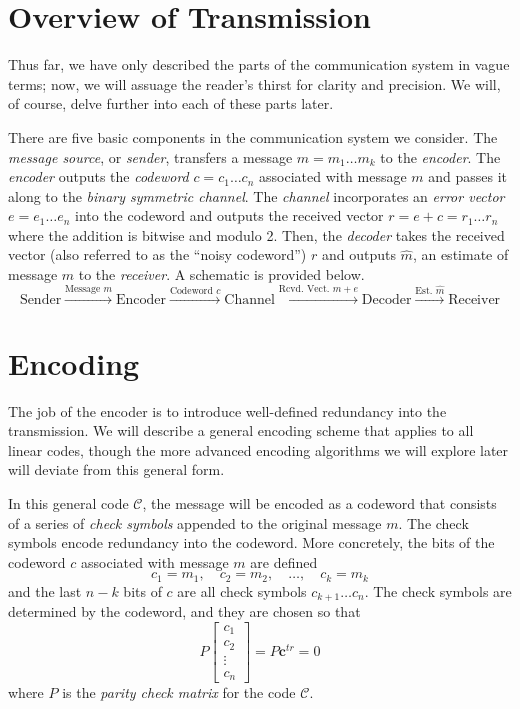\documentclass[12pt,twoside]{reedthesis}
\theoremstyle{definition}
\begin{document}
\section{Overview of Transmission}

Thus far, we have only described the parts of the communication system in vague terms; now, we will assuage the reader's thirst for clarity and precision. We will, of course, delve further into each of these parts later.

There are five basic components in the communication system we consider. The \textit{message source}, or \textit{sender}, transfers a message $m = m_1 \ldots m_k$ to the \textit{encoder}. The \textit{encoder} outputs the \textit{codeword} $c = c_1\ldots c_n$ associated with message $m$ and passes it along to the \textit{binary symmetric channel}. The \textit{channel} incorporates an \textit{error vector} $e = e_1 \ldots e_n$ into the codeword and outputs the received vector $r = e + c = r_1 \ldots r_n$ where the addition is bitwise and modulo 2. Then, the \textit{decoder} takes the received vector (also referred to as the ``noisy codeword'') $r$ and outputs $\hat{m}$, an estimate of message $m$ to the \textit{receiver}. A schematic is provided below.
\begin{equation*}
\text{Sender} \xrightarrow{\text{Message }m} \text{Encoder} \xrightarrow{\text{Codeword }c} \text{Channel} \xrightarrow{\text{Rcvd.~Vect.~}m+e} \text{Decoder} \xrightarrow{\text{Est. }\hat{m}} \text{Receiver}
\end{equation*}

\section{Encoding}
The job of the encoder is to introduce well-defined redundancy into the transmission. We will describe a general encoding scheme that applies to all linear codes, though the more advanced encoding algorithms we will explore later will deviate from this general form.

In this general code $\mathscr{C}$, the message will be encoded as a codeword that consists of a series of \textit{check symbols} appended to the original message $m$. The check symbols encode redundancy into the codeword. More concretely, the bits of the codeword $c$ associated with message $m$ are defined
\begin{equation*}
c_1 = m_1, \quad c_2 = m_2, \quad \ldots,\quad c_k = m_k
\end{equation*}
and the last $n-k$ bits of $c$ are all check symbols $c_{k+1} \ldots c_n$. The check symbols are determined by the codeword, and they are chosen so that 
\begin{equation*}
P \begin{bmatrix}
c_{1}\\
c_{2}\\
\vdots\\
c_n
\end{bmatrix} = 
P \mathbf{c}^{tr}= 0
\end{equation*}
where $P$ is the \textit{parity check matrix} for the code $\mathscr{C}$.
\end{document}
